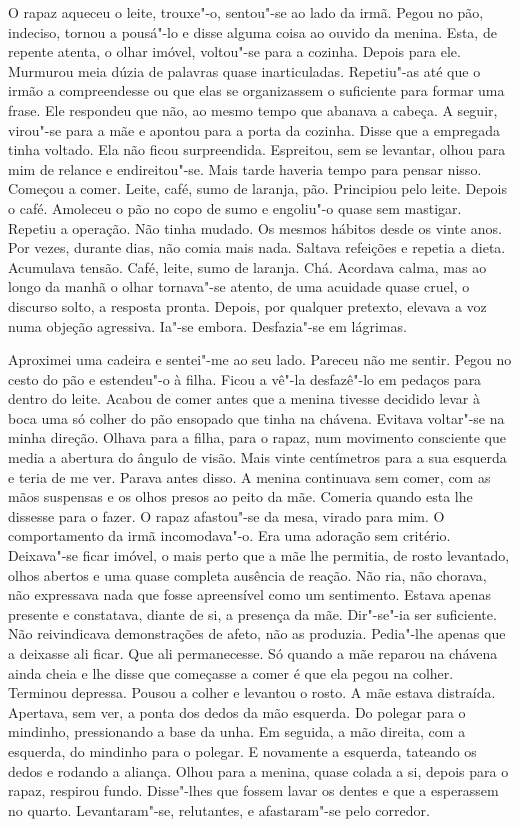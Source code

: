 O rapaz aqueceu o leite, trouxe"-o, sentou"-se ao lado da irmã. Pegou no
pão, indeciso, tornou a pousá"-lo e disse alguma coisa ao ouvido da
menina. Esta, de repente atenta, o olhar imóvel, voltou"-se para a
cozinha. Depois para ele. Murmurou meia dúzia de palavras quase
inarticuladas. Repetiu"-as até que o irmão a compreendesse ou que elas
se organizassem o suficiente para formar uma frase. Ele respondeu que
não, ao mesmo tempo que abanava a cabeça. A seguir, virou"-se para a mãe
e apontou para a porta da cozinha. Disse que a empregada tinha voltado.
Ela não ficou surpreendida. Espreitou, sem se levantar, olhou para mim
de relance e endireitou"-se. Mais tarde haveria tempo para pensar nisso.
Começou a comer. Leite, café, sumo de laranja, pão. Principiou pelo
leite. Depois o café. Amoleceu o pão no copo de sumo e engoliu"-o quase
sem mastigar. Repetiu a operação. Não tinha mudado. Os mesmos hábitos
desde os vinte anos. Por vezes, durante dias, não comia mais nada.
Saltava refeições e repetia a dieta. Acumulava tensão. Café, leite, sumo
de laranja. Chá. Acordava calma, mas ao longo da manhã o olhar
tornava"-se atento, de uma acuidade quase cruel, o discurso solto, a
resposta pronta. Depois, por qualquer pretexto, elevava a voz numa
objeção agressiva. Ia"-se embora. Desfazia"-se em lágrimas.

Aproximei uma cadeira e sentei"-me ao seu lado. Pareceu não me sentir.
Pegou no cesto do pão e estendeu"-o à filha. Ficou a vê"-la desfazê"-lo
em pedaços para dentro do leite. Acabou de comer antes que a menina
tivesse decidido levar à boca uma só colher do pão ensopado que tinha na
chávena. Evitava voltar"-se na minha direção. Olhava para a filha, para
o rapaz, num movimento consciente que media a abertura do ângulo de
visão. Mais vinte centímetros para a sua esquerda e teria de me ver.
Parava antes disso. A menina continuava sem comer, com as mãos suspensas
e os olhos presos ao peito da mãe. Comeria quando esta lhe dissesse para
o fazer. O rapaz afastou"-se da mesa, virado para mim. O comportamento
da irmã incomodava"-o. Era uma adoração sem critério. Deixava"-se ficar
imóvel, o mais perto que a mãe lhe permitia, de rosto levantado, olhos
abertos e uma quase completa ausência de reação. Não ria, não chorava,
não expressava nada que fosse apreensível como um sentimento. Estava
apenas presente e constatava, diante de si, a presença da mãe.
Dir"-se"-ia ser suficiente. Não reivindicava demonstrações de afeto,
não as produzia. Pedia"-lhe apenas que a deixasse ali ficar. Que ali
permanecesse. Só quando a mãe reparou na chávena ainda cheia e lhe disse
que começasse a comer é que ela pegou na colher. Terminou depressa.
Pousou a colher e levantou o rosto. A mãe estava distraída. Apertava,
sem ver, a ponta dos dedos da mão esquerda. Do polegar para o mindinho,
pressionando a base da unha. Em seguida, a mão direita, com a esquerda,
do mindinho para o polegar. E novamente a esquerda, tateando os dedos e
rodando a aliança. Olhou para a menina, quase colada a si, depois para o
rapaz, respirou fundo. Disse"-lhes que fossem lavar os dentes e que a
esperassem no quarto. Levantaram"-se, relutantes, e afastaram"-se pelo
corredor.

